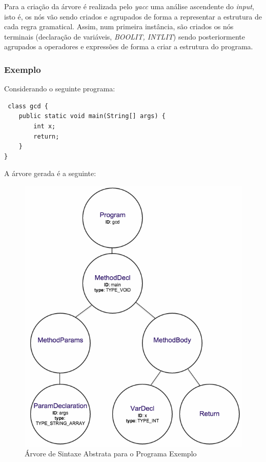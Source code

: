 \documentclass[12pt]{article}
\begin{document}
Para a criação da árvore é realizada pelo \emph{yacc} uma análise ascendente do \emph{input}, isto é, os nós vão sendo criados e agrupados de forma a representar a estrutura de cada regra gramatical. Assim, num primeira instância, são criados os nós terminais (declaração de variáveis, \emph{BOOLIT, INTLIT}) sendo posteriormente agrupados a operadores e expressões de forma a criar a estrutura do programa.

\subsubsection{Exemplo}
Considerando o seguinte programa:

\begin{lstlisting}
 class gcd {
 	public static void main(String[] args) {
    	int x;
    	return;
	} 		
}
\end{lstlisting}

A árvore gerada é a seguinte:

\begin{figure}[H]
       \centering
       \includegraphics[keepaspectratio=true, scale = 0.41]{arvore.png}
       \caption{Árvore de Sintaxe Abstrata para o Programa Exemplo}
\end{figure}
\end{document}

